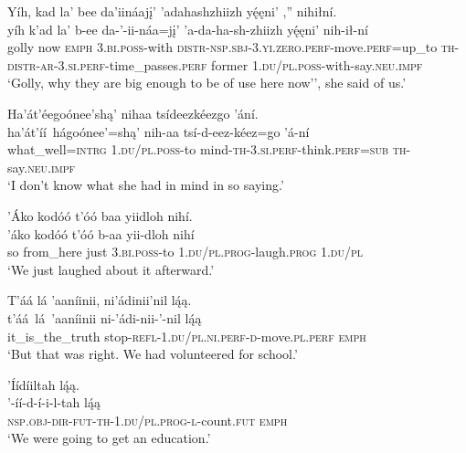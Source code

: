 \newpage
\ea\label{ex:text1-30-7}
Yíh, kad la’ bee da’iináajį’ ’adahashzhiizh yę́ęni’ ,'' nihiłní.\\
\gll yíh	k’ad	la’	b-ee	da-’-ii-náa=jį’	’a-da-ha-sh-zhiizh	yę́ęni’	nih-ił-ní\\
     golly	now	\textsc{emph}	3.\textsc{bi}.\textsc{poss}-with	\textsc{distr}-\textsc{nsp}.\textsc{sbj}-3.\textsc{yi}.\textsc{zero}.\textsc{perf}-move.\textsc{perf}=up\_to	\textsc{th}-\textsc{distr}-\textsc{ar}-3.\textsc{si}.\textsc{perf}-time\_passes.\textsc{perf}	former	1.\textsc{du}/\textsc{pl}.\textsc{poss}-with-say.\textsc{neu}.\textsc{impf}\\
\glt `Golly, why they are big enough to be of use here now'', she said of us.'
\z

\ea\label{ex:text1-30-8}
Ha’át’éegoónee’shą’ nihaa tsídeezkéezgo ’ání.\\
\gll ha’át’íí~{hágoónee’}=shą’	nih-aa	tsí-d-eez-kéez=go	’á-ní\\
     what\_well=\textsc{intrg}	1.\textsc{du}/\textsc{pl}.\textsc{poss}-to	mind-\textsc{th}-3.\textsc{si}.\textsc{perf}-think.\textsc{perf}=\textsc{sub}	\textsc{th}-say.\textsc{neu}.\textsc{impf}\\
\glt `I don't know what she had in mind in so saying.'
\z

\ea\label{ex:text1-30-9}
’Áko kodóó t’óó baa yiidloh nihí.\\
\gll ’áko	kodóó	t’óó	b-aa	yii-dloh	nihí\\
     so	from\_here	just	3.\textsc{bi}.\textsc{poss}-to	1.\textsc{du}/\textsc{pl}.\textsc{prog}-laugh.\textsc{prog}	1.\textsc{du}/\textsc{pl}\\
\glt `We just laughed about it afterward.'
\z

\ea\label{ex:text1-30-10}
T’áá lá ’aaníinii, ni’ádinii’nil lą́ą.\\
\gll t’áá~lá~{’aaníinii}	ni-’ádi-nii-’-nil	lą́ą\\
     it\_is\_the\_truth	stop-\textsc{refl}-1.\textsc{du}/\textsc{pl}.\textsc{ni}.\textsc{perf}-\textsc{d}-move.\textsc{pl}.\textsc{perf}	\textsc{emph}\\
\glt `But that was right. We had volunteered for school.'
\z

\ea\label{ex:text1-30-11}
’Íídíiltah lą́ą.\\
\gll ’-íí-d-í-i-l-tah	lą́ą\\
     \textsc{nsp}.\textsc{obj}-\textsc{dir}-\textsc{fut}-\textsc{th}-1.\textsc{du}/\textsc{pl}.\textsc{prog}-\textsc{l}-count.\textsc{fut}	\textsc{emph}\\
\glt `We were going to get an education.'
\z

